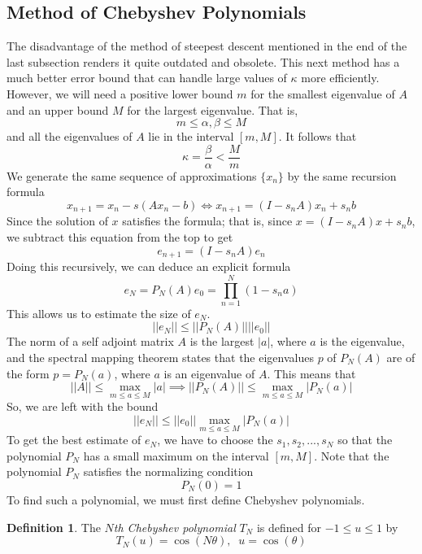 \documentclass{article}
\theoremstyle{remark}
\theoremstyle{definition}
\newtheorem{definition}{Definition}[section]
\begin{document}
\subsection{Method of Chebyshev Polynomials}
The disadvantage of the method of steepest descent mentioned in the end of the last subsection renders it quite outdated and obsolete. This next method has a much better error bound that can handle large values of $\kappa$ more efficiently. However, we will need a positive lower bound $m$ for the smallest eigenvalue of $A$ and an upper bound $M$ for the largest eigenvalue. That is, 
\[m \leq \alpha, \beta \leq M\]
and all the eigenvalues of $A$ lie in the interval $[m, M]$. It follows that
\[\kappa = \frac{\beta}{\alpha} < \frac{M}{m}\]
We generate the same sequence of approximations $\{x_n\}$ by the same recursion formula
\[x_{n+1} = x_n - s(A x_n - b) \iff x_{n+1} = (I - s_n A) x_n + s_n b\]
Since the solution of $x$ satisfies the formula; that is, since $x = (I - s_n A) x + s_n b$, we subtract this equation from the top to get
\[e_{n+1} = (I - s_n A) e_n\]
Doing this recursively, we can deduce an explicit formula 
\[e_N = P_N (A) e_0 = \prod_{n=1}^N (1 - s_n a)\]
This allows us to estimate the size of $e_N$. 
\[||e_N|| \leq ||P_N (A)|| ||e_0||\]
The norm of a self adjoint matrix $A$ is the largest $|a|$, where $a$ is the eigenvalue, and the spectral mapping theorem states that the eigenvalues $p$ of $P_N (A)$ are of the form $p = P_N (a)$, where $a$ is an eigenvalue of $A$. This means that
\[||A|| \leq \max_{m \leq a \leq M} |a| \implies ||P_N (A)|| \leq \max_{m \leq a \leq M} |P_N (a)|\]
So, we are left with the bound
\[||e_N|| \leq ||e_0|| \max_{m \leq a \leq M} |P_N (a)|\]
To get the best estimate of $e_N$, we have to choose the $s_1, s_2, ..., s_N$ so that the polynomial $P_N$ has a small maximum on the interval $[m, M]$. Note that the polynomial $P_N$ satisfies the normalizing condition 
\[P_N(0) = 1\]
To find such a polynomial, we must first define Chebyshev polynomials. 

\begin{definition}
The \textit{$N$th Chebyshev polynomial} $T_N$ is defined for $-1 \leq u \leq 1$ by
\[T_N (u) = \cos (N \theta), \;\; u = \cos(\theta)\]
\end{definition}
\end{document}
